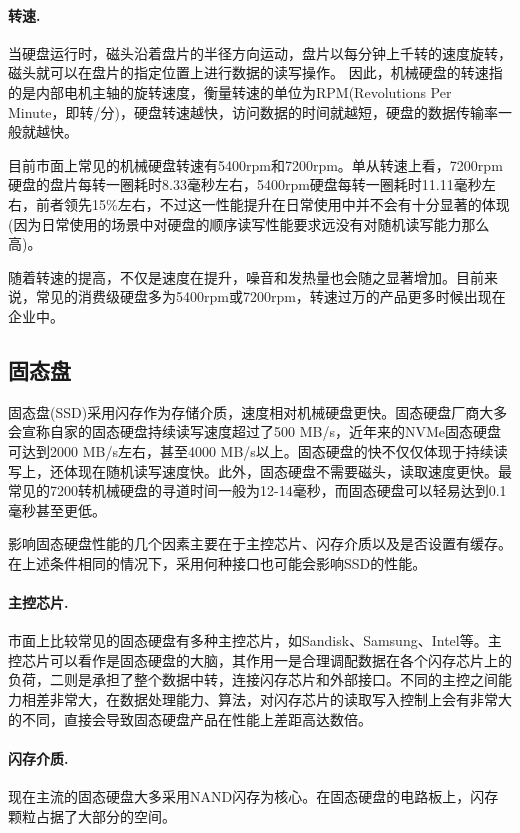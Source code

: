 \documentclass[final]{cvpr}
\newcommand{\mypara}[1]{\paragraph{#1.}}
\begin{document}
\mypara{转速}

当硬盘运行时，磁头沿着盘片的半径方向运动，盘片以每分钟上千转的速度旋转，磁头就可以在盘片的指定位置上进行数据的读写操作。
因此，机械硬盘的转速指的是内部电机主轴的旋转速度，衡量转速的单位为RPM(Revolutions Per Minute，即转/分)，硬盘转速越快，访问数据的时间就越短，硬盘的数据传输率一般就越快。

目前市面上常见的机械硬盘转速有5400rpm和7200rpm。单从转速上看，7200rpm硬盘的盘片每转一圈耗时8.33毫秒左右，5400rpm硬盘每转一圈耗时11.11毫秒左右，前者领先15\%左右，不过这一性能提升在日常使用中并不会有十分显著的体现(因为日常使用的场景中对硬盘的顺序读写性能要求远没有对随机读写能力那么高)。

随着转速的提高，不仅是速度在提升，噪音和发热量也会随之显著增加。目前来说，常见的消费级硬盘多为5400rpm或7200rpm，转速过万的产品更多时候出现在企业中。

\subsection{\textbf{固态盘}}

固态盘(SSD)采用闪存作为存储介质，速度相对机械硬盘更快。固态硬盘厂商大多会宣称自家的固态硬盘持续读写速度超过了500 MB/s，近年来的NVMe固态硬盘可达到2000 MB/s左右，甚至4000 MB/s以上。固态硬盘的快不仅仅体现于持续读写上，还体现在随机读写速度快。此外，固态硬盘不需要磁头，读取速度更快。最常见的7200转机械硬盘的寻道时间一般为12-14毫秒，而固态硬盘可以轻易达到0.1毫秒甚至更低。

影响固态硬盘性能的几个因素主要在于主控芯片、闪存介质以及是否设置有缓存。在上述条件相同的情况下，采用何种接口也可能会影响SSD的性能。

\mypara{主控芯片}

市面上比较常见的固态硬盘有多种主控芯片，如Sandisk、Samsung、Intel等。主控芯片可以看作是固态硬盘的大脑，其作用一是合理调配数据在各个闪存芯片上的负荷，二则是承担了整个数据中转，连接闪存芯片和外部接口。不同的主控之间能力相差非常大，在数据处理能力、算法，对闪存芯片的读取写入控制上会有非常大的不同，直接会导致固态硬盘产品在性能上差距高达数倍。

\mypara{闪存介质}

现在主流的固态硬盘大多采用NAND闪存为核心。在固态硬盘的电路板上，闪存颗粒占据了大部分的空间。
\end{document}
